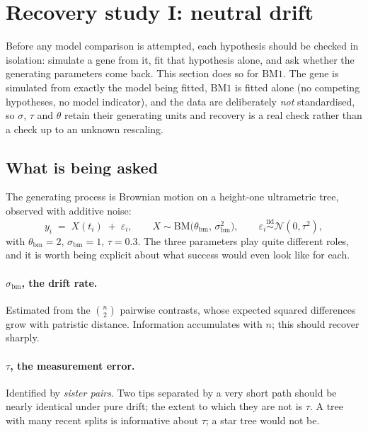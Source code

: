 \documentclass[11pt]{article}
\newcommand{\BM}{\mathrm{BM1}}
\begin{document}
\section{Recovery study I: neutral drift}
\label{sec:recovery-bm}

Before any model comparison is attempted, each hypothesis should be checked in isolation: simulate a
gene from it, fit that hypothesis alone, and ask whether the generating parameters come back. This
section does so for $\BM$. The gene is simulated from exactly the model being fitted, $\BM$ is fitted
alone (no competing hypotheses, no model indicator), and the data are deliberately \emph{not}
standardised, so $\sigma$, $\tau$ and $\theta$ retain their generating units and recovery is a real
check rather than a check up to an unknown rescaling.

\subsection*{What is being asked}

The generating process is Brownian motion on a height-one ultrametric tree, observed with additive
noise:
\begin{equation}
y_i \;=\; X(t_i) \;+\; \varepsilon_i, \qquad
X \sim \mathrm{BM}\bigl(\theta_{\mathrm{bm}},\, \sigma_{\mathrm{bm}}^{2}\bigr), \qquad
\varepsilon_i \overset{\text{iid}}{\sim} \mathcal{N}(0, \tau^{2}),
\end{equation}
with $\theta_{\mathrm{bm}} = 2$, $\sigma_{\mathrm{bm}} = 1$, $\tau = 0.3$. The three parameters play
quite different roles, and it is worth being explicit about what success would even look like for
each.

\paragraph{$\sigma_{\mathrm{bm}}$, the drift rate.} Estimated from the $\binom{n}{2}$ pairwise
contrasts, whose expected squared differences grow with patristic distance. Information accumulates
with $n$; this should recover sharply.

\paragraph{$\tau$, the measurement error.} Identified by \emph{sister pairs}. Two tips separated by a
very short path should be nearly identical under pure drift; the extent to which they are not is
$\tau$. A tree with many recent splits is informative about $\tau$; a star tree would not be.
\end{document}
